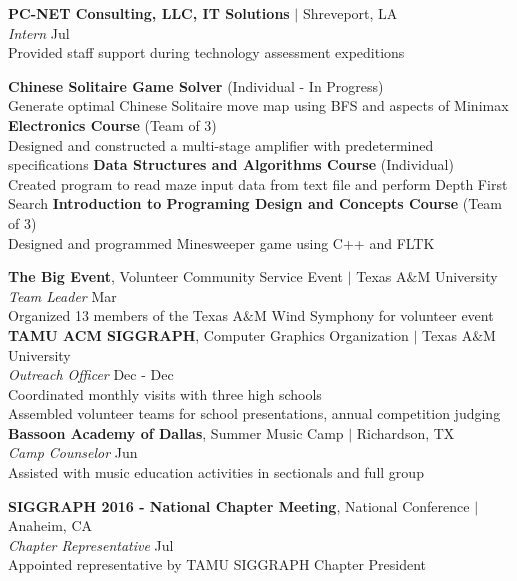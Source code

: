 \documentclass[12pt]{article}
\begin{document}
\begin{flushleft}
\begin{outline}[compactitem]
    \1 \textbf{PC-NET Consulting, LLC, IT Solutions} $|$ Shreveport, LA
  \\    \textit{Intern} \hfill Jul 
  \\    Provided staff support during technology assessment expeditions

  \1 \textbf{Chinese Solitaire Game Solver} (Individual - In Progress)
   \\  Generate optimal Chinese Solitaire move map using BFS and aspects of Minimax
  \1 \textbf{Electronics Course} (Team of 3)
    \\ Designed and constructed a multi-stage amplifier with predetermined specifications
  \1 \textbf{Data Structures and Algorithms Course}  (Individual)
    \\ Created program to read maze input data from text file and perform Depth First Search 
  \1 \textbf{Introduction to Programing Design and Concepts Course} (Team of 3)
    \\ Designed and programmed Minesweeper game using C++ and FLTK


\1  \textbf{The Big Event}, Volunteer Community Service Event $|$ Texas A$\&$M University
\\      \textit{Team Leader} \hfill Mar  
\\      Organized 13 members of the Texas A$\&$M Wind Symphony for volunteer event
\1    \textbf{TAMU ACM SIGGRAPH}, Computer Graphics Organization $|$ Texas A$\&$M University
\\      \textit{Outreach Officer} \hfill Dec  - Dec 
\\      Coordinated monthly visits with three high schools
\\      Assembled volunteer teams for school presentations, annual competition judging   
\1      \textbf{Bassoon Academy of Dallas}, Summer Music Camp $|$ Richardson, TX
\\      \textit{Camp Counselor} \hfill Jun 
\\      Assisted with music education activities in sectionals and full group

\1      \textbf{SIGGRAPH 2016 - National Chapter Meeting}, National Conference $|$ Anaheim, CA
\\      \textit{Chapter Representative} \hfill Jul 
\\      Appointed representative by TAMU SIGGRAPH Chapter President 
  \hfill %


\end{outline}
\end{flushleft}
\end{document}
